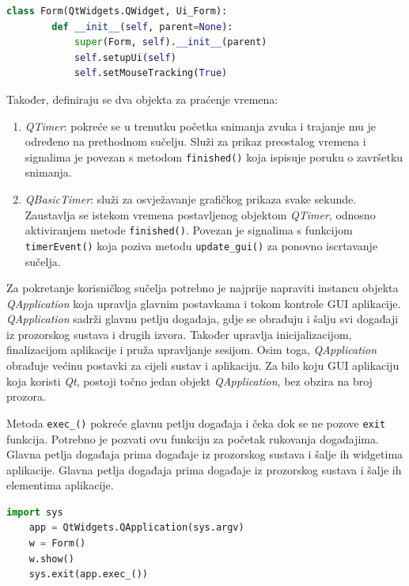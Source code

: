 \begin{lstlisting}[caption={Definicija klase \textit{Form} i njezin konstruktor}, language=Python]
	class Form(QtWidgets.QWidget, Ui_Form):
		def __init__(self, parent=None):
			super(Form, self).__init__(parent)
			self.setupUi(self)
			self.setMouseTracking(True)
\end{lstlisting}

Također, definiraju se dva objekta za praćenje vremena:
\begin{enumerate}
	\item \textit{QTimer}: pokreće se u trenutku početka snimanja zvuka i trajanje mu je određeno na prethodnom sučelju. Služi za prikaz preostalog vremena i signalima je povezan s metodom \lstinline|finished()| koja ispisuje poruku o završetku snimanja.
	\item \textit{QBasicTimer}: služi za osvježavanje grafičkog prikaza svake sekunde. Zaustavlja se istekom vremena postavljenog objektom \textit{QTimer}, odnosno aktiviranjem metode \lstinline|finished()|. Povezan je signalima s funkcijom \lstinline|timerEvent()| koja poziva metodu \lstinline|update_gui()| za ponovno iscrtavanje sučelja.
\end{enumerate}

Za pokretanje korisničkog sučelja potrebno je najprije napraviti instancu objekta \textit{QApplication} koja upravlja glavnim postavkama i tokom kontrole GUI aplikacije. \textit{QApplication} sadrži glavnu petlju događaja, gdje se obrađuju i šalju svi događaji iz prozorskog sustava i drugih izvora. Također upravlja inicijalizacijom, finalizacijom aplikacije i pruža upravljanje sesijom. Osim toga, \textit{QApplication} obrađuje većinu postavki za cijeli sustav i aplikaciju. Za bilo koju GUI aplikaciju koja koristi \textit{Qt}, postoji točno jedan objekt \textit{QApplication}, bez obzira na broj prozora. 

Metoda \lstinline|exec_()| pokreće glavnu petlju događaja i čeka dok se ne pozove \lstinline|exit| funkcija. Potrebno je pozvati ovu funkciju za početak rukovanja događajima. Glavna petlja događaja prima događaje iz prozorskog sustava i šalje ih widgetima aplikacije. Glavna petlja događaja prima događaje iz prozorskog sustava i šalje ih elementima  aplikacije.

\begin{lstlisting}[caption={Naredbe za pokretanje korisničkog sučelja}, language=Python]
	import sys
	app = QtWidgets.QApplication(sys.argv)
	w = Form()
	w.show()
	sys.exit(app.exec_())
\end{lstlisting}


